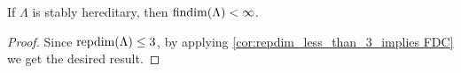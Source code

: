 %		

\begin{cor}
	If $\Lambda$ is stably hereditary, then $\operatorname{findim}(\Lambda) < \infty$.
	\begin{proof}
		Since $\operatorname{repdim}(\Lambda) \leq 3$, by applying \cref{cor:repdim_less_than_3_implies FDC} we get the desired result.
	\end{proof} 
\end{cor}